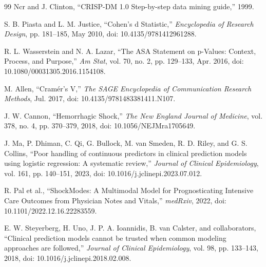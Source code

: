\documentclass[12pt, letterpaper]{article}
\begin{document}
\begin{thebibliography}{99}
Ncr and J. Clinton, ``CRISP-DM 1.0 Step-by-step data mining guide,'' 1999.

S. B. Piasta and L. M. Justice, ``Cohen's d Statistic,'' \textit{Encyclopedia of Research Design}, pp. 181--185, May 2010, doi: 10.4135/9781412961288.

R. L. Wasserstein and N. A. Lazar, ``The ASA Statement on p-Values: Context, Process, and Purpose,'' \textit{Am Stat}, vol. 70, no. 2, pp. 129--133, Apr. 2016, doi: 10.1080/00031305.2016.1154108.

M. Allen, ``Cramér's V,'' \textit{The SAGE Encyclopedia of Communication Research Methods}, Jul. 2017, doi: 10.4135/9781483381411.N107.

J. W. Cannon, ``Hemorrhagic Shock,'' \textit{The New England Journal of Medicine}, vol. 378, no. 4, pp. 370--379, 2018, doi: 10.1056/NEJMra1705649.

J. Ma, P. Dhiman, C. Qi, G. Bullock, M. van Smeden, R. D. Riley, and G. S. Collins, ``Poor handling of continuous predictors in clinical prediction models using logistic regression: A systematic review,'' \textit{Journal of Clinical Epidemiology}, vol. 161, pp. 140--151, 2023, doi: 10.1016/j.jclinepi.2023.07.012.

R. Pal et al., ``ShockModes: A Multimodal Model for Prognosticating Intensive Care Outcomes from Physician Notes and Vitals,'' \textit{medRxiv}, 2022, doi: 10.1101/2022.12.16.22283559.

E. W. Steyerberg, H. Uno, J. P. A. Ioannidis, B. van Calster, and collaborators, ``Clinical prediction models cannot be trusted when common modeling approaches are followed,'' \textit{Journal of Clinical Epidemiology}, vol. 98, pp. 133--143, 2018, doi: 10.1016/j.jclinepi.2018.02.008.

\end{thebibliography}
\end{document}
